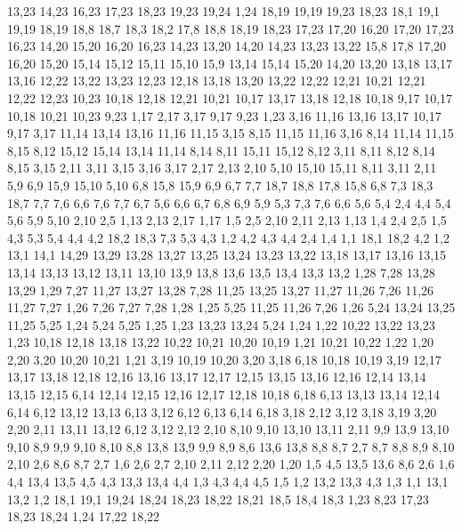 13,23
14,23
16,23
17,23
18,23
19,23
19,24
1,24
%
18,19
19,19
19,23
18,23
%
18,1
19,1
19,19
18,19
18,8
18,7
18,3
18,2
%
17,8
18,8
18,19
18,23
17,23
17,20
%
16,20
17,20
17,23
16,23
%
14,20
15,20
16,20
16,23
14,23
%
13,20
14,20
14,23
13,23
13,22
%
15,8
17,8
17,20
16,20
15,20
15,14
15,12
15,11
15,10
15,9
%
13,14
15,14
15,20
14,20
13,20
13,18
13,17
13,16
%
12,22
13,22
13,23
12,23
%
12,18
13,18
13,20
13,22
12,22
12,21
%
10,21
12,21
12,22
12,23
10,23
%
10,18
12,18
12,21
10,21
%
10,17
13,17
13,18
12,18
10,18
%
9,17
10,17
10,18
10,21
10,23
9,23
%
1,17
2,17
3,17
9,17
9,23
1,23
%
3,16
11,16
13,16
13,17
10,17
9,17
3,17
%
11,14
13,14
13,16
11,16
11,15
%
3,15
8,15
11,15
11,16
3,16
%
8,14
11,14
11,15
8,15
%
8,12
15,12
15,14
13,14
11,14
8,14
%
8,11
15,11
15,12
8,12
%
3,11
8,11
8,12
8,14
8,15
3,15
%
2,11
3,11
3,15
3,16
3,17
2,17
2,13
%
2,10
5,10
15,10
15,11
8,11
3,11
2,11
%
5,9
6,9
15,9
15,10
5,10
%
6,8
15,8
15,9
6,9
%
6,7
7,7
18,7
18,8
17,8
15,8
6,8
%
7,3
18,3
18,7
7,7
7,6
%
6,6
7,6
7,7
6,7
%
5,6
6,6
6,7
6,8
6,9
5,9
%
5,3
7,3
7,6
6,6
5,6
5,4
%
2,4
4,4
5,4
5,6
5,9
5,10
2,10
2,5
%
1,13
2,13
2,17
1,17
%
1,5
2,5
2,10
2,11
2,13
1,13
%
1,4
2,4
2,5
1,5
%
4,3
5,3
5,4
4,4
%
4,2
18,2
18,3
7,3
5,3
4,3
%
1,2
4,2
4,3
4,4
2,4
1,4
%
1,1
18,1
18,2
4,2
1,2
13,1
14,1
14,29
13,29
13,28
13,27
13,25
13,24
13,23
13,22
13,18
13,17
13,16
13,15
13,14
13,13
13,12
13,11
13,10
13,9
13,8
13,6
13,5
13,4
13,3
13,2
%
1,28
7,28
13,28
13,29
1,29
%
7,27
11,27
13,27
13,28
7,28
%
11,25
13,25
13,27
11,27
11,26
%
7,26
11,26
11,27
7,27
%
1,26
7,26
7,27
7,28
1,28
%
1,25
5,25
11,25
11,26
7,26
1,26
%
5,24
13,24
13,25
11,25
5,25
%
1,24
5,24
5,25
1,25
%
1,23
13,23
13,24
5,24
1,24
%
1,22
10,22
13,22
13,23
1,23
%
10,18
12,18
13,18
13,22
10,22
10,21
10,20
10,19
%
1,21
10,21
10,22
1,22
%
1,20
2,20
3,20
10,20
10,21
1,21
%
3,19
10,19
10,20
3,20
%
3,18
6,18
10,18
10,19
3,19
%
12,17
13,17
13,18
12,18
%
12,16
13,16
13,17
12,17
%
12,15
13,15
13,16
12,16
%
12,14
13,14
13,15
12,15
%
6,14
12,14
12,15
12,16
12,17
12,18
10,18
6,18
%
6,13
13,13
13,14
12,14
6,14
%
6,12
13,12
13,13
6,13
%
3,12
6,12
6,13
6,14
6,18
3,18
%
2,12
3,12
3,18
3,19
3,20
2,20
%
2,11
13,11
13,12
6,12
3,12
2,12
%
2,10
8,10
9,10
13,10
13,11
2,11
%
9,9
13,9
13,10
9,10
%
8,9
9,9
9,10
8,10
%
8,8
13,8
13,9
9,9
8,9
%
8,6
13,6
13,8
8,8
8,7
%
2,7
8,7
8,8
8,9
8,10
2,10
%
2,6
8,6
8,7
2,7
%
1,6
2,6
2,7
2,10
2,11
2,12
2,20
1,20
%
1,5
4,5
13,5
13,6
8,6
2,6
1,6
%
4,4
13,4
13,5
4,5
%
4,3
13,3
13,4
4,4
%
1,3
4,3
4,4
4,5
1,5
%
1,2
13,2
13,3
4,3
1,3
%
1,1
13,1
13,2
1,2
18,1
19,1
19,24
18,24
18,23
18,22
18,21
18,5
18,4
18,3
%
1,23
8,23
17,23
18,23
18,24
1,24
%
17,22
18,22
